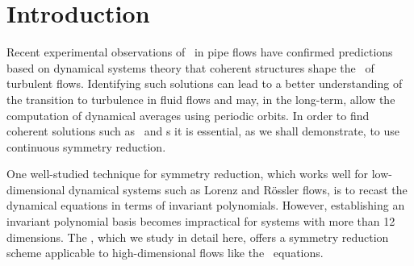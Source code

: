 \section{Introduction}
\label{s:intro}

Recent experimental observations of \reqva\ in pipe flows have confirmed
predictions based on dynamical systems theory that coherent structures shape 
the \statesp\ of turbulent flows. Identifying such solutions can lead to a better
understanding of the transition to turbulence in fluid flows and may, in the long-term,
allow the computation of dynamical averages using periodic orbits. In order to
find coherent solutions such as \reqva\ and \rpo s it is essential, as we shall demonstrate, 
to use continuous symmetry reduction.

One well-studied technique for symmetry reduction, which works well for low-dimensional dynamical systems such 
as Lorenz and R\"{o}ssler flows, is to recast the dynamical equations in terms of invariant polynomials. 
However, establishing an invariant polynomial basis becomes impractical 
for systems with more than 12 dimensions.
The \mslices%
,
which we study in detail here, offers a symmetry reduction
scheme applicable to high-dimensional flows like the \NS\ equations.

